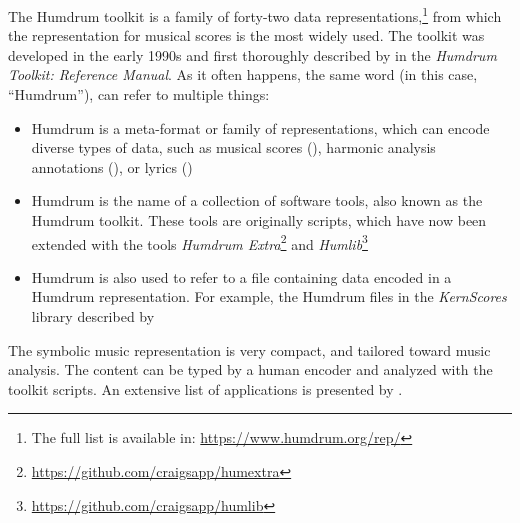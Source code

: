


The Humdrum toolkit is a family of forty-two data
representations,\footnote{The full list is available in:
\href{https://www.humdrum.org/rep/}{https://www.humdrum.org/rep/}}
from which the  representation for musical
scores is the most widely used. The toolkit was developed in
the early 1990s and first thoroughly described by
\textcite{huron1994humdrum} in the \emph{Humdrum Toolkit:
Reference Manual}. As it often happens, the same word (in
this case, ``Humdrum''), can refer to multiple things:

\begin{itemize}
    \item Humdrum is a meta-format or family of
    representations, which can encode diverse types of data,
    such as musical scores (), harmonic
    analysis annotations (), or lyrics
    ()
    \item Humdrum is the name of a collection of software
    tools, also known as the Humdrum toolkit. These tools
    are originally  scripts, which have now been
    extended with the  tools \emph{Humdrum
    Extra}\footnote{\href{https://github.com/craigsapp/humextra}{https://github.com/craigsapp/humextra}}
    and
    \emph{Humlib}\footnote{\href{https://github.com/craigsapp/humlib}{https://github.com/craigsapp/humlib}}
    \item Humdrum is also used to refer to a file containing
    data encoded in a Humdrum representation. For example,
    the Humdrum files in the \emph{KernScores} library
    described by~\textcite{sapp2005online}
\end{itemize}


The  symbolic music representation is very
compact, and tailored toward music analysis. The content can
be typed by a human encoder and analyzed with the toolkit
scripts. An extensive list of applications is presented by
\textcite{sapp2011computational}.

